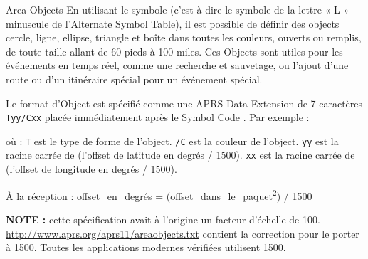 \begin{aprssideblock}{Area Objects}
En utilisant le symbole  (c'est-à-dire le symbole de la
lettre « L » minuscule de l'Alternate Symbol Table), il est possible de
définir des objects cercle, ligne, ellipse, triangle et boîte dans toutes
les couleurs, ouverts ou remplis, de toute taille allant de 60 pieds à
100 miles. Ces Objects sont utiles pour les événements en temps réel, comme
une recherche et sauvetage, ou l'ajout d'une route ou d'un itinéraire
spécial pour un événement spécial.

Le format d'Object est spécifié comme une APRS Data Extension de
7 caractères \texttt{Tyy/Cxx} placée immédiatement après le Symbol Code
. Par exemple :

où :
\texttt{T} est le type de forme de l'object. \texttt{/C} est la couleur de
l'object. \texttt{yy} est la racine carrée de (l'offset de latitude en
degrés / 1500). \texttt{xx} est la racine carrée de (l'offset de longitude
en degrés / 1500).

À la réception :
offset\_en\_degrés = (offset\_dans\_le\_paquet\textsuperscript{2}) / 1500

\textbf{NOTE :} cette spécification avait à l'origine un facteur d'échelle
de 100. \url{http://www.aprs.org/aprs11/areaobjects.txt} contient la
correction pour le porter à 1500. Toutes les applications modernes
vérifiées utilisent 1500.
\end{aprssideblock}

